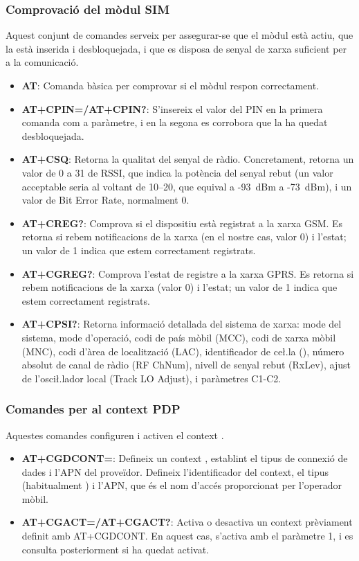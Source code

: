 \documentclass{tfgitic}[2024/07/01]
\begin{document}
\subsubsection{Comprovació del mòdul SIM} 
Aquest conjunt de comandes serveix per assegurar-se que el mòdul està actiu, que la  està inserida i desbloquejada, i que es disposa de senyal de 
xarxa suficient per a la comunicació.
\begin{itemize}
  \item \textbf{AT}: Comanda bàsica per comprovar si el mòdul respon correctament.

  \item \textbf{AT+CPIN=/AT+CPIN?}: S'insereix el valor del PIN en la primera comanda com a paràmetre, i en la segona es corrobora que la  ha quedat desbloquejada.

  \item \textbf{AT+CSQ}: Retorna la qualitat del senyal de ràdio. Concretament, retorna un valor de 0 a 31 de RSSI, que indica la potència del senyal rebut (un valor acceptable seria al 
  voltant de 10--20, que equival a -93~dBm a -73~dBm), i un valor de Bit Error Rate, normalment 0.

  \item \textbf{AT+CREG?}: Comprova si el dispositiu està registrat a la xarxa GSM. Es retorna si rebem notificacions de la xarxa (en el nostre cas, valor 0) i l'estat; un valor de 1 indica 
  que estem correctament registrats.

  \item \textbf{AT+CGREG?}: Comprova l'estat de registre a la xarxa GPRS. Es retorna si rebem notificacions de la xarxa (valor 0) i l'estat; un valor de 1 indica que estem correctament registrats.
  
  \item \textbf{AT+CPSI?}: Retorna informació detallada del sistema de xarxa: mode del sistema, mode d'operació, codi de país mòbil (MCC), codi de xarxa mòbil (MNC), codi d'àrea de localització 
  (LAC), identificador de ce\l.la (), número absolut de canal de ràdio (RF ChNum), nivell de senyal rebut (RxLev), ajust de l'osci\l.lador local (Track LO Adjust), i paràmetres C1-C2.
\end{itemize}

\subsubsection{Comandes per al context PDP} 
Aquestes comandes configuren i activen el context .
\begin{itemize}
  \item \textbf{AT+CGDCONT=}: Defineix un context , establint el tipus de connexió de dades i l'APN del proveïdor. Defineix l'identificador del context, el tipus  (habitualment ) 
  i l'APN, que és el nom d'accés proporcionat per l'operador mòbil.

  \item \textbf{AT+CGACT=/AT+CGACT?}: Activa o desactiva un context  prèviament definit amb AT+CGDCONT. En aquest cas, s'activa amb el paràmetre 1, i es consulta posteriorment 
  si ha quedat activat.
\end{itemize}
\end{document}
